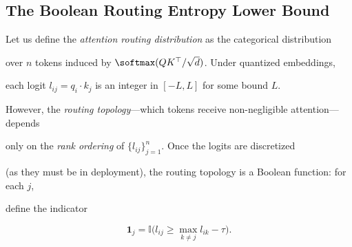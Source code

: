 \subsection{The Boolean Routing Entropy Lower Bound}











Let us define the \emph{attention routing distribution} as the categorical distribution





over $n$ tokens induced by $\softmax(QK^\top / \sqrt{d})$. Under quantized embeddings,





each logit $l_{ij} = q_i \cdot k_j$ is an integer in $[-L, L]$ for some bound $L$.











However, the \emph{routing topology}---which tokens receive non-negligible attention---depends





only on the \emph{rank ordering} of $\{l_{ij}\}_{j=1}^n$. Once the logits are discretized





(as they must be in deployment), the routing topology is a Boolean function: for each $j$,





define the indicator





\[





\mathbf{1}_j = \mathbb{I}\bigl(l_{ij} \geq \max_{k \neq j} l_{ik} - \tau\bigr).





\]











